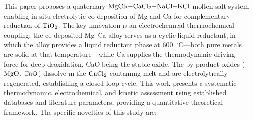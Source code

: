 \documentclass[11pt]{article}
\begin{document}
This paper proposes a quaternary $\ce{MgCl2-CaCl2-NaCl-KCl}$ molten salt system enabling in-situ electrolytic co-deposition of Mg and Ca for complementary reduction of $\ce{TiO2}$. The key innovation is an electrochemical-thermochemical coupling: the co-deposited Mg--Ca alloy serves as a cyclic liquid reductant, in which the alloy provides a liquid reductant phase at 600~$^{\circ}$C---both pure metals are solid at that temperature---while Ca supplies the thermodynamic driving force for deep deoxidation, CaO being the stable oxide. The by-product oxides ($\ce{MgO}$, $\ce{CaO}$) dissolve in the $\ce{CaCl2}$-containing melt and are electrolytically regenerated, establishing a closed-loop cycle. This work presents a systematic thermodynamic, electrochemical, and kinetic assessment using established databases \cite{barin1995,waldner1999} and literature parameters, providing a quantitative theoretical framework. The specific novelties of this study are:
\end{document}
